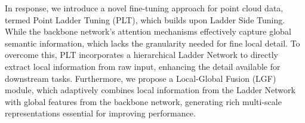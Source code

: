 
In response, we introduce a novel fine-tuning approach for point cloud data, termed Point Ladder Tuning (PLT), which builds upon Ladder Side Tuning. While the backbone network’s attention mechanisms effectively capture global semantic information, which lacks the granularity needed for fine local detail. To overcome this, PLT incorporates a hierarchical Ladder Network to directly extract local information from raw input, enhancing the detail available for downstream tasks. Furthermore, we propose a Local-Global Fusion (LGF) module, which adaptively combines local information from the Ladder Network with global features from the backbone network, generating rich multi-scale representations essential for improving performance.



% 

